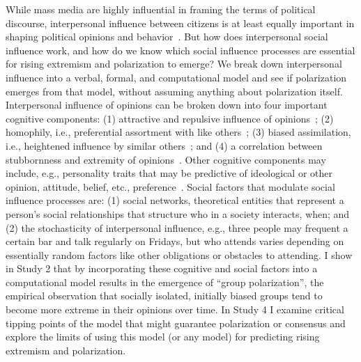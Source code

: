 \documentclass[12pt,letterpaper]{article}
\begin{document}
While mass media are highly influential in framing the terms of political
discourse, interpersonal influence between citizens is at least equally important in
shaping political opinions and behavior~\cite{Katz1955}. But how does 
interpersonal social influence work, and how do we know which social 
influence processes are essential for rising extremism and polarization to
emerge? We break down interpersonal influence into a verbal, formal, and computational
model and see if polarization emerges from that model, without assuming anything
about polarization itself. Interpersonal influence of opinions can be broken down into
four important cognitive components: (1) attractive and repulsive influence of
opinions~\cite{French1956,Cikara2014}; (2) homophily, i.e., preferential assortment with like others~\cite{McPherson2001};
(3) biased assimilation, i.e., heightened influence by similar others~\cite{Dandekar2013}; and
(4) a correlation between stubbornness and extremity of opinions~\cite{Reiss2019,Zmigrod2019a}. 
Other cognitive components may include, e.g., personality traits that may be predictive of 
ideological or other opinion, attitude, belief, etc., preference~\cite{Zmigrod2018}.
Social factors that modulate social influence processes are: (1) social
networks, theoretical entities that represent a person's social relationships
that structure who in a society interacts, when; and (2) the stochasticity
of interpersonal influence, e.g., three people may frequent a certain bar
and talk regularly on Fridays, but who attends varies depending on essentially
random factors like other obligations or obstacles to attending. I show in
Study 2 that by incorporating these cognitive and social factors into a computational
model results in the emergence of ``group polarization'', the empirical 
observation that socially isolated, initially biased groups tend to become
more extreme in their opinions over time. In Study 4 I examine critical
tipping points of the model that might guarantee polarization or consensus and
explore the limits of using this model (or any model) for predicting 
rising extremism and polarization.
\end{document}
